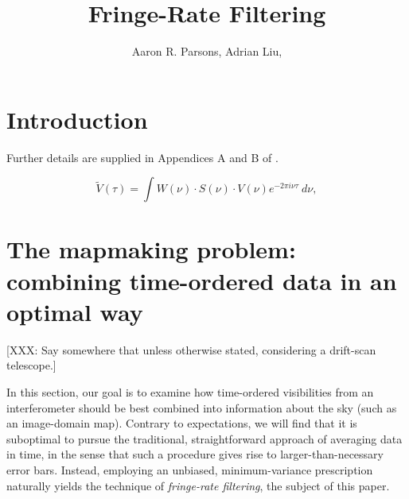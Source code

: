 \documentclass[twocolumn,apj,numberedappendix]{emulateapj}
\begin{document}
\title{Fringe-Rate Filtering}

\author{
Aaron R. Parsons,
Adrian Liu,
}


\begin{abstract}
\end{abstract}


\section{Introduction}

Further details are supplied in Appendices A and B of \citet{parsons_et_al2013}.

\begin{equation}
\tilde{V}(\tau)=\int{W(\nu)\cdot S(\nu)\cdot V(\nu)e^{-2\pi i\nu\tau}~d\nu},
\label{eq:dtransform}
\end{equation}


\section{The mapmaking problem: combining time-ordered data in an optimal way}

[XXX: Say somewhere that unless otherwise stated, considering a drift-scan telescope.]

In this section, our goal is to examine how time-ordered visibilities from an
interferometer should be best combined into information about the sky (such as
an image-domain map).  Contrary to expectations, we will find that it is
suboptimal to pursue the traditional, straightforward approach of averaging
data in time, in the sense that such a procedure gives rise to
larger-than-necessary error bars.  Instead, employing an unbiased,
minimum-variance prescription naturally yields the technique of
\emph{fringe-rate filtering}, the subject of this paper.
\end{document}
